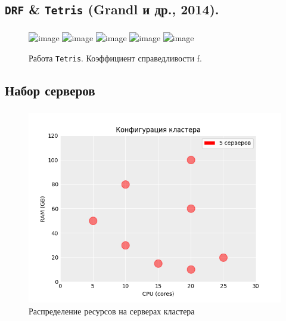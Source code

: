 \documentclass[t]{beamer}  %
\begin{document}
\subsection{\texttt{DRF} \& \texttt{Tetris} (Grandl и др., 2014).} 

\begin{frame}[fragile]
	\frametitle{\insertsection} 
	\framesubtitle{\insertsubsection}

	\begin{figure}[H]
		\centering
		\includegraphics<1>[width=0.8\linewidth]{images/tetris_pipeline_0} 
		\includegraphics<2>[width=0.8\linewidth]{images/tetris_pipeline_1} 
		\includegraphics<3>[width=0.8\linewidth]{images/tetris_pipeline_2} 
		\includegraphics<4>[width=0.8\linewidth]{images/tetris_pipeline_3} 
		\includegraphics<5>[width=0.8\linewidth]{images/tetris_pipeline_4} 
		\caption*{Работа \texttt{Tetris}. Коэффициент справедливости f.}
	\end{figure}


\end{frame}

\subsection{Набор серверов}

\begin{frame}[fragile]
	\frametitle{\insertsection} 
	\framesubtitle{\insertsubsection}

	\vspace{-0.5cm}
	
\begin{figure}[H]
    \centering 
    \includegraphics[width=0.8\linewidth]{images/hosts_distribution}
    \caption*{Распределение ресурсов на серверах кластера}
\end{figure}


\end{frame}
\end{document}
